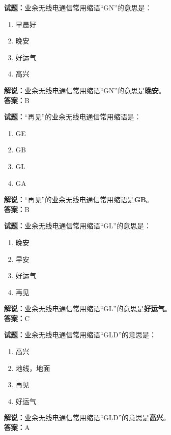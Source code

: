 \documentclass{ctexbook}
\begin{document}
\bigskip


\noindent\textbf{试题：}业余无线电通信常用缩语“GN”的意思是：
\begin{enumerate}[leftmargin=3em]
\item 早晨好
\item 晚安
\item 好运气
\item 高兴
\end{enumerate}
\noindent\textbf{解说：}业余无线电通信常用缩语“GN”的意思是\textbf{晚安}。\\\noindent\textbf{答案：}B

\bigskip


\noindent\textbf{试题：}“再见”的业余无线电通信常用缩语是：
\begin{enumerate}[leftmargin=3em]
\item GE
\item GB
\item GL
\item GA
\end{enumerate}
\noindent\textbf{解说：}“再见”的业余无线电通信常用缩语是\textbf{GB}。\\\noindent\textbf{答案：}B



\bigskip


\noindent\textbf{试题：}业余无线电通信常用缩语“GL”的意思是：
\begin{enumerate}[leftmargin=3em]
\item 晚安
\item 早安
\item 好运气
\item 再见
\end{enumerate}
\noindent\textbf{解说：}业余无线电通信常用缩语“GL”的意思是\textbf{好运气}。\\\noindent\textbf{答案：}C



\bigskip


\noindent\textbf{试题：}业余无线电通信常用缩语“GLD”的意思是：
\begin{enumerate}[leftmargin=3em]
\item 高兴
\item 地线，地面
\item 再见
\item 好运气
\end{enumerate}
\noindent\textbf{解说：}业余无线电通信常用缩语“GLD”的意思是\textbf{高兴}。\\\noindent\textbf{答案：}A
\end{document}
